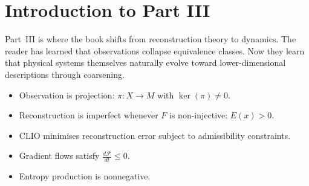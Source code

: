 
\chapter*{Introduction to Part III}

Part~III is where the book shifts from reconstruction theory
to dynamics.
The reader has learned that observations collapse equivalence
classes.
Now they learn that physical systems themselves naturally evolve
toward lower-dimensional descriptions through coarsening.

\begin{tcolorbox}[
  title={\textbf{Established So Far}},
  colback=boxgreen,colframe=green!50!black,
  fonttitle=\small\sffamily
]
\begin{itemize}[leftmargin=1.5em,itemsep=2pt]
  \item Observation is projection: $\pi : X \to M$ with
    $\ker(\pi) \neq 0$.
  \item Reconstruction is imperfect whenever $F$ is
    non-injective: $E(x) > 0$.
  \item CLIO minimises reconstruction error subject to
    admissibility constraints.
  \item Gradient flows satisfy $\frac{d\mathcal{F}}{dt} \leq 0$.
  \item Entropy production is nonnegative.
\end{itemize}
\end{tcolorbox}

\bigskip

